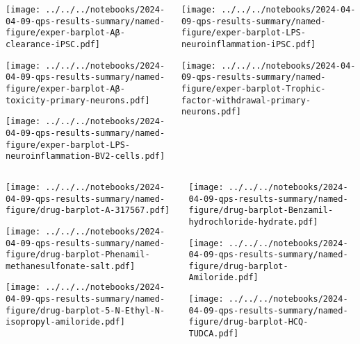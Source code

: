 \documentclass[aspectratio=169]{beamer}
\begin{document}
\begin{frame}
\begin{columns}[t]
\begin{column}{0.5\textwidth}
  \flushright

  \texttt{[image: ../../../notebooks/2024-04-09-qps-results-summary/named-figure/exper-barplot-Aβ-clearance-iPSC.pdf]}

  \texttt{[image: ../../../notebooks/2024-04-09-qps-results-summary/named-figure/exper-barplot-Aβ-toxicity-primary-neurons.pdf]}

  \texttt{[image: ../../../notebooks/2024-04-09-qps-results-summary/named-figure/exper-barplot-LPS-neuroinflammation-BV2-cells.pdf]}
\end{column}

\begin{column}{0.5\textwidth}
  \flushright

  \texttt{[image: ../../../notebooks/2024-04-09-qps-results-summary/named-figure/exper-barplot-LPS-neuroinflammation-iPSC.pdf]}

  \texttt{[image: ../../../notebooks/2024-04-09-qps-results-summary/named-figure/exper-barplot-Trophic-factor-withdrawal-primary-neurons.pdf]}
\end{column}
\end{columns}
\end{frame}


\begin{frame}
\begin{columns}[t]
\begin{column}{0.5\textwidth}

  \texttt{[image: ../../../notebooks/2024-04-09-qps-results-summary/named-figure/drug-barplot-A-317567.pdf]}

  \texttt{[image: ../../../notebooks/2024-04-09-qps-results-summary/named-figure/drug-barplot-Phenamil-methanesulfonate-salt.pdf]}

  \texttt{[image: ../../../notebooks/2024-04-09-qps-results-summary/named-figure/drug-barplot-5-N-Ethyl-N-isopropyl-amiloride.pdf]}
\end{column}

\begin{column}{0.5\textwidth}

  \texttt{[image: ../../../notebooks/2024-04-09-qps-results-summary/named-figure/drug-barplot-Benzamil-hydrochloride-hydrate.pdf]}

  \texttt{[image: ../../../notebooks/2024-04-09-qps-results-summary/named-figure/drug-barplot-Amiloride.pdf]}

  \texttt{[image: ../../../notebooks/2024-04-09-qps-results-summary/named-figure/drug-barplot-HCQ-TUDCA.pdf]}

\end{column}
\end{columns}
\end{frame}
\end{document}

